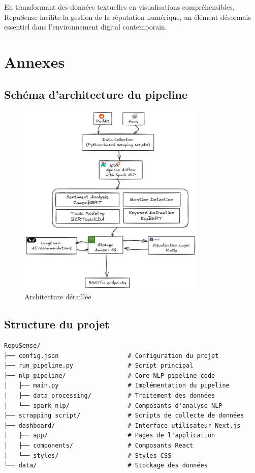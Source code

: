 \documentclass[12pt,a4paper]{report}
\begin{document}
En transformant des données textuelles en visualisations compréhensibles, RepuSense facilite la gestion de la réputation numérique, un élément désormais essentiel dans l'environnement digital contemporain.

\chapter{Annexes}

\section{Schéma d'architecture du pipeline}
\begin{figure}[h]
    \centering
    \includegraphics[width=0.8\textwidth]{schema.png}
    \caption{Architecture détaillée}
\end{figure}

\section{Structure du projet}
\begin{verbatim}
RepuSense/
├── config.json                   # Configuration du projet
├── run_pipeline.py               # Script principal
├── nlp_pipeline/                 # Core NLP pipeline code
│   ├── main.py                   # Implémentation du pipeline
│   ├── data_processing/          # Traitement des données
│   └── spark_nlp/                # Composants d'analyse NLP
├── scrapping script/             # Scripts de collecte de données
├── dashboard/                    # Interface utilisateur Next.js
│   ├── app/                      # Pages de l'application
│   ├── components/               # Composants React
│   └── styles/                   # Styles CSS
└── data/                         # Stockage des données
\end{verbatim}
\end{document}
